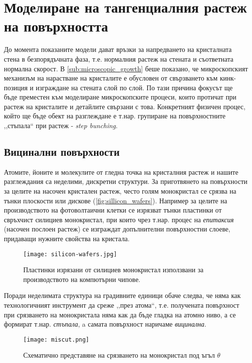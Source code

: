 \section{Моделиране на тангенциалния растеж на повърхността}
До момента показаните модели дават връзки за напредването на кристалната стена в безпорядъчната фаза, т.е. нормалния растеж на стената и съответната нормална скорост. В \autoref{sub:microscopic_growth} беше показано, че микроскопският механизъм на нарастване на кристалите е обусловен от свързването към кинк-позиция и изграждане на стената слой по слой. По тази причина фокусът ще бъде преместен към моделиране микроскопските процеси, които протичат при растеж на кристалите и детайлите свързани с това. Конкретният физичен процес, който ще бъде обект на разглеждане е т.нар. групиране на повърхностните ,,стъпала`` при растеж - \textit{step bunching}.
\subsection{Вицинални повърхности}
Атомите, йоните и молекулите от гледна точка на кристалния растеж и нашите разглеждания са неделими, дискретни структури. За приготвянето на повърхности за целите на насочен кристален растеж, често голям монокристал се срязва на тънки плоскости или дискове (\autoref{fig:sillicon_wafers}). Например за целите на производството на фотоволтаични клетки се изрязват тънки пластинки от свръхчист силициев монокристал, при които чрез т.нар. процес на \textit{епитаксия} (насочен послоен растеж) се изграждат допълнителни повърхностни слоеве, придаващи нужните свойства на кристала.
\begin{figure}[htbp]
	\centering
	\texttt{[image: silicon-wafers.jpg]}
	\caption{Пластинки изрязани от силициев монокристал използвани за производството на компютърни чипове. \cite{debold_waffers_2011}}
	\label{fig:sillicon_wafers}
\end{figure}
Поради неделимата структура на градивните единици обаче следва, че няма как технологичният инструмент да среже ,,през атома``, т.е. получената повърхност при срязването на монокристала няма как да бъде гладка на атомно ниво, а се формират т.нар. \textit{стъпала}, a самата повърхност наричаме \textit{вицинална}.
\begin{figure}[htbp]
	\centering
	\texttt{[image: miscut.png]}
	\caption{Схематично представяне на срязването на монокристал под ъгъл $\theta$}
	\label{fig:miscut_crystal}
\end{figure}

